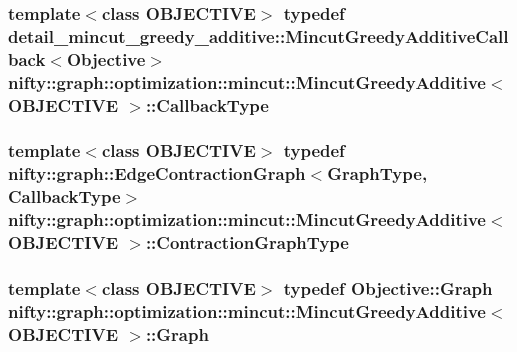 \subsubsection[{Callback\+Type}]{\setlength{\rightskip}{0pt plus 5cm}template$<$class O\+B\+J\+E\+C\+T\+I\+V\+E$>$ typedef detail\+\_\+mincut\+\_\+greedy\+\_\+additive\+::\+Mincut\+Greedy\+Additive\+Callback$<${\bf Objective}$>$ {\bf nifty\+::graph\+::optimization\+::mincut\+::\+Mincut\+Greedy\+Additive}$<$ O\+B\+J\+E\+C\+T\+I\+V\+E $>$\+::{\bf Callback\+Type}}\label{classnifty_1_1graph_1_1optimization_1_1mincut_1_1MincutGreedyAdditive_a2a20d815b0e3c083ed85bcb4c1b60bc6}
\hypertarget{classnifty_1_1graph_1_1optimization_1_1mincut_1_1MincutGreedyAdditive_a3db08a332c5b2d05634f10afd38a472b}{}
\subsubsection[{Contraction\+Graph\+Type}]{\setlength{\rightskip}{0pt plus 5cm}template$<$class O\+B\+J\+E\+C\+T\+I\+V\+E$>$ typedef {\bf nifty\+::graph\+::\+Edge\+Contraction\+Graph}$<${\bf Graph\+Type}, {\bf Callback\+Type}$>$ {\bf nifty\+::graph\+::optimization\+::mincut\+::\+Mincut\+Greedy\+Additive}$<$ O\+B\+J\+E\+C\+T\+I\+V\+E $>$\+::{\bf Contraction\+Graph\+Type}}\label{classnifty_1_1graph_1_1optimization_1_1mincut_1_1MincutGreedyAdditive_a3db08a332c5b2d05634f10afd38a472b}
\hypertarget{classnifty_1_1graph_1_1optimization_1_1mincut_1_1MincutGreedyAdditive_a47ab8e725aaf16f5f27805c5c9bb1202}{}
\subsubsection[{Graph}]{\setlength{\rightskip}{0pt plus 5cm}template$<$class O\+B\+J\+E\+C\+T\+I\+V\+E$>$ typedef Objective\+::\+Graph {\bf nifty\+::graph\+::optimization\+::mincut\+::\+Mincut\+Greedy\+Additive}$<$ O\+B\+J\+E\+C\+T\+I\+V\+E $>$\+::{\bf Graph}}\label{classnifty_1_1graph_1_1optimization_1_1mincut_1_1MincutGreedyAdditive_a47ab8e725aaf16f5f27805c5c9bb1202}
\hypertarget{classnifty_1_1graph_1_1optimization_1_1mincut_1_1MincutGreedyAdditive_a1a09c513454d8fc5d51d4a8cb28d5c54}{}
